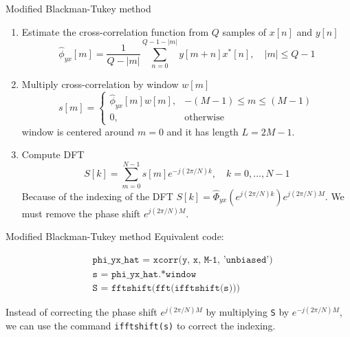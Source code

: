 \documentclass[10pt]{beamer}
\begin{document}
%
\begin{frame}{Modified Blackman-Tukey method}
\begin{enumerate}
	\item Estimate the cross-correlation function from $Q$ samples of $x[n]$ and $y[n]$
	\begin{equation*}
	\hat{\phi}_{yx}[m] = \frac{1}{Q-|m|}\sum_{n = 0}^{Q-1-|m|} y[m+n]x^*[n], \quad |m|\leq Q-1
	\end{equation*}
	\item Multiply cross-correlation by window $w[m]$
	\begin{equation*}
	s[m] = \begin{cases}
	\hat{\phi}_{yx}[m]w[m], & -(M-1)\leq m \leq (M-1) \\
	0, & \text{otherwise}
	\end{cases}
	\end{equation*}
	window is centered around $m = 0$ and it has length $L = 2M-1$.
	\item Compute DFT
	\begin{equation*}
	S[k] = \sum_{m = 0}^{N-1}s[m]e^{-j(2\pi/N)k}, \quad k = 0, \ldots, N-1
	\end{equation*}
	Because of the indexing of the DFT $S[k] = \hat{\Phi}_{yx}(e^{j(2\pi/N)k})e^{j(2\pi/N)M}$. We must remove the phase shift $e^{j(2\pi/N)M}$.
\end{enumerate}
\end{frame}

%
\begin{frame}{Modified Blackman-Tukey method}
Equivalent code:

\begin{align*}
&\texttt{phi\_yx\_hat = xcorr(y, x, M-1, 'unbiased')} \\
&\texttt{s = phi\_yx\_hat.*window} \\
&\texttt{S = fftshift(fft(ifftshift(s)))}
\end{align*}

Instead of correcting the phase shift $e^{j(2\pi/N)M}$ by multiplying \texttt{S} by $e^{-j(2\pi/N)M}$, we can use the command \texttt{ifftshift(s)} to correct the indexing.

\end{frame}
	
\end{document}
